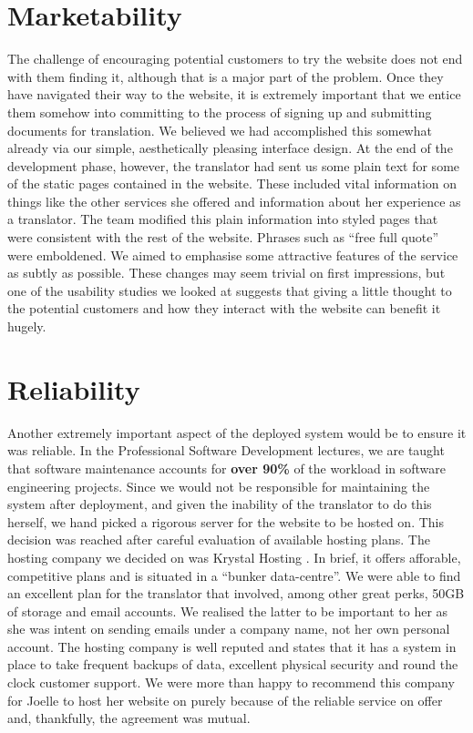\documentclass{l3proj}
\begin{document}
\section{Marketability}
The challenge of encouraging potential customers to try the website does not end with them finding it, although 
that is a major part of the problem. Once they have navigated their way to the website, it is extremely important 
that we entice them somehow into committing to the process of signing up and submitting documents for translation.
We believed we had accomplished this somewhat already via our simple, aesthetically pleasing interface design.
At the end of the development phase, however, the translator had sent us some plain text for some of the static 
pages contained in the website. These included vital information on things like the other services she offered
and information about her experience as a translator. The team modified this plain information into styled pages
that were consistent with the rest of the website. Phrases such as ``free full quote'' were emboldened. We 
aimed to emphasise some attractive features of the service as subtly as possible. These changes may seem 
trivial on first impressions, but one of the usability studies we looked at \cite{sixr} suggests that giving a little thought to the potential customers
and how they interact with the website can benefit it hugely.
\section{Reliability}
\label{sec:reliab}
Another extremely important aspect of the deployed system would be to ensure it was reliable. In the 
Professional Software Development lectures, we are taught that {software maintenance} accounts for
\textbf{over 90\%} of the workload in software engineering projects. Since we would not be responsible for 
maintaining the system after deployment, and given the inability of the translator to do this 
herself, we hand picked a rigorous server for the website to be hosted on. This decision was reached after
careful evaluation of available hosting plans. The hosting company we decided on was Krystal Hosting \cite{kry}.
 In brief, it offers afforable, competitive plans and is situated in a 
``bunker data-centre''. We were able to find an excellent plan for the translator that involved, among other
 great perks, 50GB of storage and email accounts.
We realised the latter to be important to her as she was intent on sending emails under a company
name, not her own personal account. The hosting company is well reputed and states that it has a system in place
to take frequent backups of data, excellent physical security and round the clock customer support. We were
more than happy to recommend this company for Joelle to host her website on purely because of the reliable
service on offer and, thankfully, the agreement was mutual.
\end{document}
